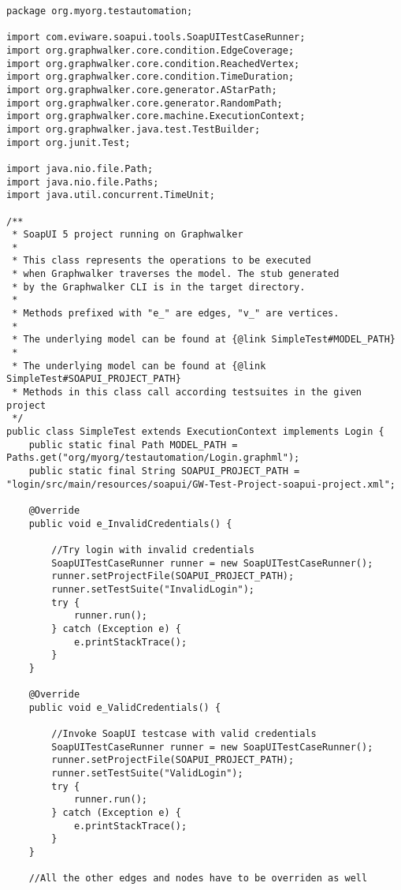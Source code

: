 \begin{lstlisting}[caption=SimpleTest.java, label=code:soap_graphwalker]
package org.myorg.testautomation;

import com.eviware.soapui.tools.SoapUITestCaseRunner;
import org.graphwalker.core.condition.EdgeCoverage;
import org.graphwalker.core.condition.ReachedVertex;
import org.graphwalker.core.condition.TimeDuration;
import org.graphwalker.core.generator.AStarPath;
import org.graphwalker.core.generator.RandomPath;
import org.graphwalker.core.machine.ExecutionContext;
import org.graphwalker.java.test.TestBuilder;
import org.junit.Test;

import java.nio.file.Path;
import java.nio.file.Paths;
import java.util.concurrent.TimeUnit;

/**
 * SoapUI 5 project running on Graphwalker
 *
 * This class represents the operations to be executed
 * when Graphwalker traverses the model. The stub generated
 * by the Graphwalker CLI is in the target directory.
 *
 * Methods prefixed with "e_" are edges, "v_" are vertices.
 *
 * The underlying model can be found at {@link SimpleTest#MODEL_PATH}
 *
 * The underlying model can be found at {@link SimpleTest#SOAPUI_PROJECT_PATH}
 * Methods in this class call according testsuites in the given project
 */
public class SimpleTest extends ExecutionContext implements Login {
    public static final Path MODEL_PATH = Paths.get("org/myorg/testautomation/Login.graphml");
    public static final String SOAPUI_PROJECT_PATH = "login/src/main/resources/soapui/GW-Test-Project-soapui-project.xml";

    @Override
    public void e_InvalidCredentials() {

        //Try login with invalid credentials
        SoapUITestCaseRunner runner = new SoapUITestCaseRunner();
        runner.setProjectFile(SOAPUI_PROJECT_PATH);
        runner.setTestSuite("InvalidLogin");
        try {
            runner.run();
        } catch (Exception e) {
            e.printStackTrace();
        }
    }

    @Override
    public void e_ValidCredentials() {

        //Invoke SoapUI testcase with valid credentials
        SoapUITestCaseRunner runner = new SoapUITestCaseRunner();
        runner.setProjectFile(SOAPUI_PROJECT_PATH);
        runner.setTestSuite("ValidLogin");
        try {
            runner.run();
        } catch (Exception e) {
            e.printStackTrace();
        }
    }

    //All the other edges and nodes have to be overriden as well


\end{lstlisting}
